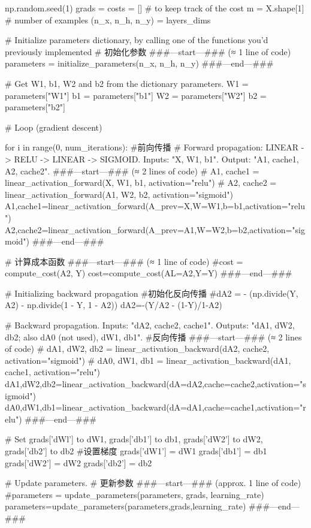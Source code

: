 \documentclass[12pt,a4paper]{article}
\begin{document}
\begin{python}
			np.random.seed(1)
			grads = {}
			costs = [] # to keep track of the cost
			m = X.shape[1] # number of examples
			(n_x, n_h, n_y) = layers_dims
			
			# Initialize parameters dictionary, by calling one of the functions you'd previously implemented
			# 初始化参数
			###---start---### (≈ 1 line of code)
			parameters = initialize_parameters(n_x, n_h, n_y)
			###---end---###
			
			# Get W1, b1, W2 and b2 from the dictionary parameters.
			W1 = parameters["W1"]
			b1 = parameters["b1"]
			W2 = parameters["W2"]
			b2 = parameters["b2"]
			
			# Loop (gradient descent)
			
			for i in range(0, num_iterations):
			#前向传播
			# Forward propagation: LINEAR -> RELU -> LINEAR -> SIGMOID. Inputs: "X, W1, b1". Output: "A1, cache1, A2, cache2".
			###---start---### (≈ 2 lines of code)
			# A1, cache1 = linear_activation_forward(X, W1, b1, activation="relu")
			# A2, cache2 = linear_activation_forward(A1, W2, b2, activation="sigmoid")
			A1,cache1=linear_activation_forward(A_prev=X,W=W1,b=b1,activation="relu")
			A2,cache2=linear_activation_forward(A_prev=A1,W=W2,b=b2,activation="sigmoid")
			###---end---###
			
			# 计算成本函数
			###---start---### (≈ 1 line of code)
			#cost = compute_cost(A2, Y)
			cost=compute_cost(AL=A2,Y=Y)
			###---end---###
			
			# Initializing backward propagation
			#初始化反向传播
			#dA2 = - (np.divide(Y, A2) - np.divide(1 - Y, 1 - A2))
			dA2=-(Y/A2  - (1-Y)/1-A2)
			
			# Backward propagation. Inputs: "dA2, cache2, cache1". Outputs: "dA1, dW2, db2; also dA0 (not used), dW1, db1".
			#反向传播
			###---start---### (≈ 2 lines of code)
			# dA1, dW2, db2 = linear_activation_backward(dA2, cache2, activation="sigmoid")
			# dA0, dW1, db1 = linear_activation_backward(dA1, cache1, activation="relu")
			dA1,dW2,db2=linear_activation_backward(dA=dA2,cache=cache2,activation="sigmoid")
			dA0,dW1,db1=linear_activation_backward(dA=dA1,cache=cache1,activation="relu")
			###---end---###
			
			# Set grads['dWl'] to dW1, grads['db1'] to db1, grads['dW2'] to dW2, grads['db2'] to db2
			#设置梯度
			grads['dW1'] = dW1
			grads['db1'] = db1
			grads['dW2'] = dW2
			grads['db2'] = db2
			
			# Update parameters.
			# 更新参数
			###---start---### (approx. 1 line of code)
			#parameters = update_parameters(parameters, grads, learning_rate)
			parameters=update_parameters(parameters,grads,learning_rate)
			###---end---###
			

\end{python}
\end{document}
